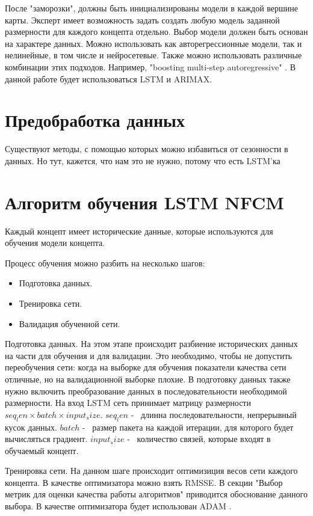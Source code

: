 После "заморозки", должны быть инициализированы модели в каждой вершине
карты. Эксперт имеет возможность задать создать любую модель заданной размерности
для каждого концепта отдельно. Выбор модели должен быть основан
на характере данных. Можно использовать как авторегрессионные модели,
так и нелинейные, в том числе и нейросетевые. Также можно использовать различные комбинации
этих подходов. Например, "boosting multi-step autoregressive" \cite{taieb2014boosting}.
В данной работе будет использоваться LSTM и ARIMAX.

\section{Предобработка данных}

Существуют методы, с помощью которых можно избавиться от сезонности
в данных. Но тут, кажется, что нам это не нужно, потому что есть LSTM'ка

\section{Алгоритм обучения LSTM NFCM}

Каждый концепт имеет исторические данные, которые используются
для обучения модели концепта.

Процесс обучения можно разбить на несколько шагов:

\begin{itemize}
	\item Подготовка данных.
	\item Тренировка сети.
	\item Валидация обученной сети.
\end{itemize}

Подготовка данных. На этом этапе происходит разбиение
исторических данных на части для обучения и для валидации.
Это необходимо, чтобы не допустить переобучения сети:
когда на выборке для обучения показатели качества сети
отличные, но на валидационной выборке плохие.
В подготовку данных также нужно включить преобразование данных
в последовательности необходимой размерности. На вход
LSTM сеть принимает матрицу размерности $ seq_len \times batch \times input_size $.
$ seq_len $ -~ длинна последовательности, непрерывный кусок данных.
$ batch $ -~ размер пакета на каждой итерации, для которого будет вычисляться градиент.
$ input_size $ -~ количество связей, которые входят в обучаемый концепт.

Тренировка сети. На данном шаге происходит оптимизиция весов
сети каждого концепта. В качестве оптимизатора
можно взять RMSSE. %
В секции "Выбор метрик для оценки качества работы алгоритмов"
приводится обоснование данного выбора.
В качестве оптимизатора будет использован ADAM \cite{adam2014}.

